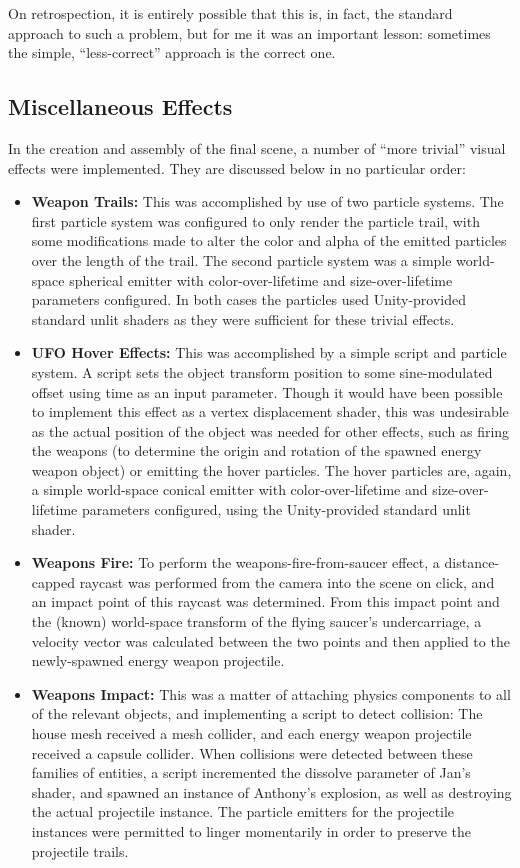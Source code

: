 On retrospection, it is entirely possible that this is, in fact, the standard approach to such a problem, but for me it was an important lesson: sometimes the simple, ``less-correct'' approach is the correct one.

\subsection{Miscellaneous Effects}
In the creation and assembly of the final scene, a number of ``more trivial'' visual effects were implemented. They are discussed below in no particular order:
\begin{itemize}
	\item \textbf{Weapon Trails:} This was accomplished by use of two particle systems. The first particle system was configured to only render the particle trail, with some modifications made to alter the color and alpha of the emitted particles over the length of the trail. The second particle system was a simple world-space spherical emitter with color-over-lifetime and size-over-lifetime parameters configured. In both cases the particles used Unity-provided standard unlit shaders as they were sufficient for these trivial effects.
	\item \textbf{UFO Hover Effects:} This was accomplished by a simple script and particle system. A script sets the object transform position to some sine-modulated offset using time as an input parameter. Though it would have been possible to implement this effect as a vertex displacement shader, this was undesirable as the actual position of the object was needed for other effects, such as firing the weapons (to determine the origin and rotation of the spawned energy weapon object) or emitting the hover particles. The hover particles are, again, a simple world-space conical emitter with color-over-lifetime and size-over-lifetime parameters configured, using the Unity-provided standard unlit shader.
	\item \textbf{Weapons Fire:} To perform the weapons-fire-from-saucer effect, a distance-capped raycast was performed from the camera into the scene on click, and an impact point of this raycast was determined. From this impact point and the (known) world-space transform of the flying saucer's undercarriage, a velocity vector was calculated between the two points and then applied to the newly-spawned energy weapon projectile.
	\newpage
	\item \textbf{Weapons Impact:} This was a matter of attaching physics components to all of the relevant objects, and implementing a script to detect collision: The house mesh received a mesh collider, and each energy weapon projectile received a capsule collider. When collisions were detected between these families of entities, a script incremented the dissolve parameter of Jan's shader, and spawned an instance of Anthony's explosion, as well as destroying the actual projectile instance. The particle emitters for the projectile instances were permitted to linger momentarily in order to preserve the projectile trails.
\end{itemize}